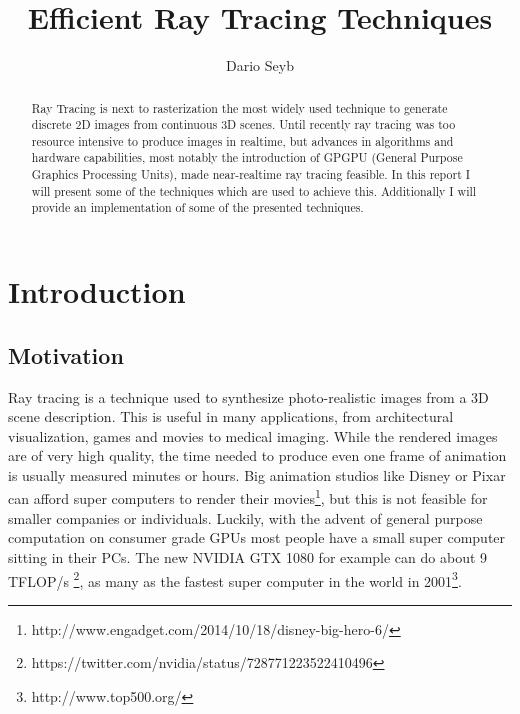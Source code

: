 \documentclass{ACGSeminar}
\begin{document}
\title{Efficient Ray Tracing Techniques}

\author{Dario Seyb}

\maketitle


\begin{abstract}
Ray Tracing is next to rasterization the most widely used technique to generate discrete 2D images from continuous 3D scenes. Until recently ray tracing was too resource intensive to produce images in realtime, but advances in algorithms and hardware capabilities, most notably the introduction of GPGPU (General Purpose Graphics Processing Units), made near-realtime ray tracing feasible. In this report I will present some of the techniques which are used to achieve this. Additionally I will provide an implementation of some of the presented techniques.
\end{abstract}

\tableofcontents


\section{Introduction} \label{introduction}
\subsection{Motivation}
Ray tracing is a technique used to synthesize photo-realistic images from a 3D scene description. This is useful in many applications, from architectural visualization, games and movies to medical imaging. While the rendered images are of very high quality, the time needed to produce even one frame of animation is usually measured minutes or hours. Big animation studios like Disney or Pixar can afford super computers to render their movies\footnote{http://www.engadget.com/2014/10/18/disney-big-hero-6/}, but this is not feasible for smaller companies or individuals. Luckily, with the advent of general purpose computation on consumer grade GPUs most people have a small super computer sitting in their PCs. The new NVIDIA GTX 1080 for example can do about 9 TFLOP/s \footnote{https://twitter.com/nvidia/status/728771223522410496}, as many as the fastest super computer in the world in 2001\footnote{http://www.top500.org/}.
\end{document}
